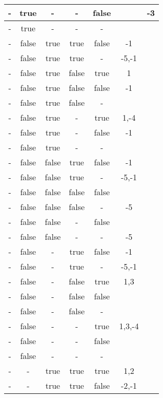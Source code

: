 \begin{longtable}{|c|c|c|c|c|c|c|}
- & true & - & - & false &                 & -3 \\ \hline 
- & true & - & - & - &                 &    \\ \hline 
- & false & true & true & false & -1              &    \\ \hline 
- & false & true & true & - & -5,-1           &    \\ \hline 
- & false & true & false & true & 1               &    \\ \hline 
- & false & true & false & false & -1              &    \\ \hline 
- & false & true & false & - &                 &    \\ \hline 
- & false & true & - & true & 1,-4            &    \\ \hline 
- & false & true & - & false & -1              &    \\ \hline 
- & false & true & - & - &                 &    \\ \hline 
- & false & false & true & false & -1              &    \\ \hline 
- & false & false & true & - & -5,-1           &    \\ \hline 
- & false & false & false & false &                 &    \\ \hline 
- & false & false & false & - & -5              &    \\ \hline 
- & false & false & - & false &                 &    \\ \hline 
- & false & false & - & - & -5              &    \\ \hline 
- & false & - & true & false & -1              &    \\ \hline 
- & false & - & true & - & -5,-1           &    \\ \hline 
- & false & - & false & true & 1,3             &    \\ \hline 
- & false & - & false & false &                 &    \\ \hline 
- & false & - & false & - &                 &    \\ \hline 
- & false & - & - & true & 1,3,-4          &    \\ \hline 
- & false & - & - & false &                 &    \\ \hline 
- & false & - & - & - &                 &    \\ \hline 
- & - & true & true & true & 1,2             &    \\ \hline 
- & - & true & true & false & -2,-1           &    \\ \hline 

\end{longtable}
